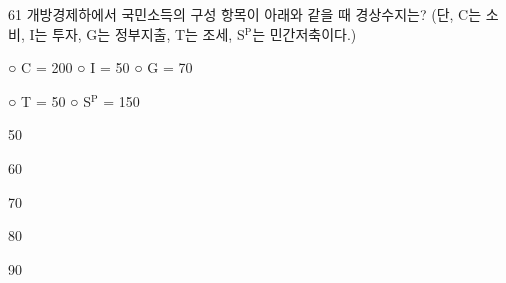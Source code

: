 \begin{question}{61}
개방경제하에서 국민소득의 구성 항목이 아래와 같을 때 경상수지는? (단, C는 소비, I는 투자, G는 정부지출, T는 조세, S$^{\mathrm{P}}$는 민간저축이다.)
\begin{framedtext}
○ C = 200 \hfill ○ I = 50 \hfill ○ G = 70 \par
○ T = 50 \hspace{2.2em} ○ S$^{\mathrm{P}}$ = 150 \hfill\mbox{}
\end{framedtext}
\begin{choices}
  \item 50
  \item 60
  \item 70
  \item 80
  \item 90
\end{choices}
\end{question}
